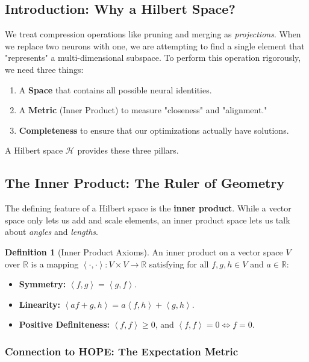 \documentclass[11pt, a4paper, copyright, gdm]{google}
\newcommand{\inner}[2]{\left\langle#1, #2\right\rangle}
\newcommand{\calH}{\mathcal{H}}
\newcommand{\R}{\mathbb{R}}
\theoremstyle{definition}
\newtheorem{definition}{Definition}[section]
\begin{document}
\subsection{Introduction: Why a Hilbert Space?}

We treat compression operations like pruning and merging as \textit{projections}. When we replace two neurons with one, we are attempting to find a single element that "represents" a multi-dimensional subspace. To perform this operation rigorously, we need three things:
\begin{enumerate}
    \item A \textbf{Space} that contains all possible neural identities.
    \item A \textbf{Metric} (Inner Product) to measure "closeness" and "alignment."
    \item \textbf{Completeness} to ensure that our optimizations actually have solutions.
\end{enumerate}
A Hilbert space $\calH$ provides these three pillars.

\subsection{The Inner Product: The Ruler of Geometry}

The defining feature of a Hilbert space is the \textbf{inner product}. While a vector space only lets us add and scale elements, an inner product space lets us talk about \textit{angles} and \textit{lengths}.

\begin{definition}[Inner Product Axioms]
An inner product on a vector space $V$ over $\R$ is a mapping $\inner{\cdot}{\cdot} : V \times V \to \R$ satisfying for all $f, g, h \in V$ and $a \in \R$:
\begin{itemize}
    \item \textbf{Symmetry:} $\inner{f}{g} = \inner{g}{f}$.
    \item \textbf{Linearity:} $\inner{af + g}{h} = a\inner{f}{h} + \inner{g}{h}$.
    \item \textbf{Positive Definiteness:} $\inner{f}{f} \geq 0$, and $\inner{f}{f} = 0 \iff f = 0$.
\end{itemize}
\end{definition}

\subsubsection{Connection to HOPE: The Expectation Metric}
\end{document}

